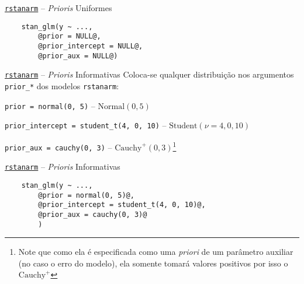 \begin{frame}[fragile]{\href{http://mc-stan.org/rstanarm/}{\texttt{rstanarm}} -- \textit{Prioris} Uniformes}
    \begin{lstlisting}
    stan_glm(y ~ ...,
        @prior = NULL@,
        @prior_intercept = NULL@,
        @prior_aux = NULL@)
    \end{lstlisting}
\end{frame}

\begin{frame}{\href{http://mc-stan.org/rstanarm/}{\texttt{rstanarm}} -- \textit{Prioris} Informativas}
    Coloca-se qualquer distribuição nos argumentos
    \lstinline!prior_*! dos modelos \texttt{rstanarm}:
    \begin{vfilleditems}
        \item \lstinline!prior = normal(0, 5)! -- $\text{Normal}(0, 5)$
        \item \lstinline!prior_intercept = student_t(4, 0, 10)! -- $\text{Student}(\nu=4, 0, 10)$
        \item  \lstinline!prior_aux = cauchy(0, 3)! -- $\text{Cauchy}^+(0, 3)$\footnote{Note que como ela é especificada como uma \textit{priori} de um parâmetro auxiliar (no caso o erro do modelo), ela somente tomará valores positivos por isso o $\text{Cauchy}^+$}
    \end{vfilleditems}
\end{frame}

\begin{frame}[fragile]{\href{http://mc-stan.org/rstanarm/}{\texttt{rstanarm}} -- \textit{Prioris} Informativas}
    \begin{lstlisting}
    stan_glm(y ~ ...,
        @prior = normal(0, 5)@,
        @prior_intercept = student_t(4, 0, 10)@,
        @prior_aux = cauchy(0, 3)@
        )
    \end{lstlisting}
\end{frame}

